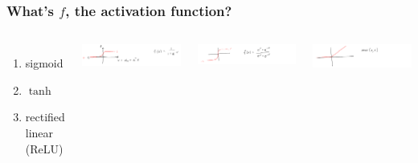 \documentclass[mathserif, aspectratio=169]{beamer}
\begin{document}
\begin{frame}[t]\frametitle{What's $f$, the activation function?}
    \begin{columns}
	    \begin{enumerate}
	    	\item sigmoid
	    	\vspace{15mm}
	    	\item $\tanh$
	    	\vspace{15mm}
	       	\item rectified linear (ReLU)
	    \end{enumerate}
	    \pause
        \includegraphics[width = 1\textwidth]{sigmoid.pdf}

    	\includegraphics[width = 1\textwidth]{tanh.pdf}

		\includegraphics[width = 1\textwidth]{rectilinear.pdf}

    \end{columns}
\end{frame}
\end{document}
